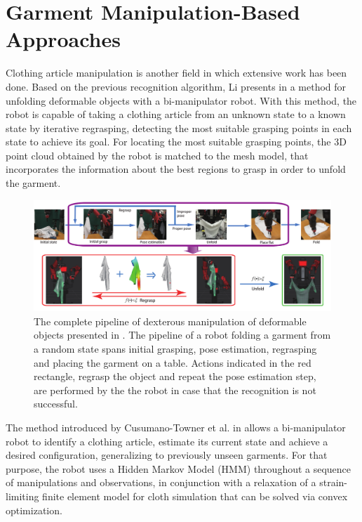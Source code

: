 \section{Garment Manipulation-Based Approaches}
\label{sota:garment_manipulation_based}
Clothing article manipulation is another field in which extensive work has been done. Based on the previous recognition algorithm, Li presents in \cite{Li2015ICRA} a method for unfolding deformable objects with a bi-manipulator robot. With this method, the robot is capable of taking a clothing article from an unknown state to a known state by iterative regrasping, detecting the most suitable grasping points in each state to achieve its goal. For locating the most suitable grasping points, the 3D point cloud obtained by the robot is matched to the mesh model, that incorporates the information about the best regions to grasp in order to unfold the garment.

\begin{figure}[thpb]
    \centering
    \includegraphics[width=\textwidth]{figures/SOTA_Li_2015.png}
    \caption[The complete pipeline of dexterous manipulation of deformable objects presented by Li et al.]
    {The complete pipeline of dexterous manipulation of deformable objects presented in \cite{Li2015ICRA}. The pipeline of a robot folding a garment from a random state spans initial grasping, pose estimation, regrasping and placing the garment on a table. Actions indicated in the red rectangle, regrasp the object and repeat the pose estimation step, are performed by the the robot in case that the recognition is not successful.}
    \label{fig:SOTA_Li_2015}
\end{figure}

The method introduced by Cusumano-Towner et al. in \cite{Cusumano-Towner2011} allows a bi-manipulator robot to identify a clothing article, estimate its current state and achieve a desired configuration, generalizing to previously unseen garments. For that purpose, the robot uses a Hidden Markov Model (HMM) throughout a sequence of manipulations and observations, in conjunction with a relaxation of a strain-limiting finite element model for cloth simulation that can be solved via convex optimization.


